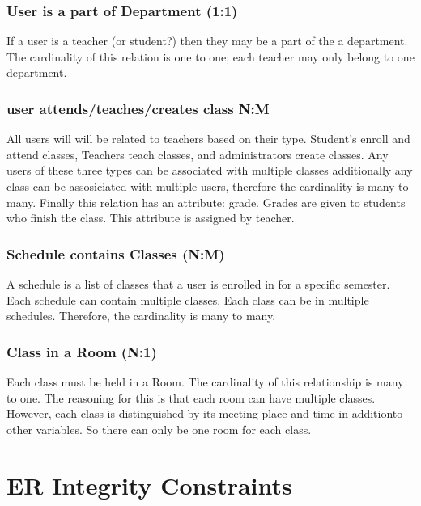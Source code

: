 \documentclass[11pt,oneside,a4paper]{article}
\begin{document}
\subsubsection{User is a part of Department (1:1)}
If a user is a teacher (or student?) then they may be a part of the a department.
 The cardinality of this relation is one to one; each teacher may only belong to 
one department.
\subsubsection{user attends/teaches/creates class N:M}
All users will will be related to teachers based on their type.  Student's enroll and 
attend classes, Teachers teach classes, and administrators create classes.  Any users 
of these three types can be associated with multiple classes additionally any class 
can be assosiciated with multiple users, therefore the cardinality is many to many. 
Finally this relation has an attribute: grade.  Grades are given to students who 
finish the class. This attribute is assigned by teacher.
\subsubsection{Schedule contains Classes (N:M)}

A schedule is a list of classes that a user is enrolled in for a specific semester.  Each schedule can contain multiple classes.  Each class can be in multiple schedules. Therefore, the cardinality is many to many. 
\subsubsection{Class in a Room (N:1)}
Each class must be held in a Room.  The cardinality of this relationship is many to one.  The reasoning for this is that each room can have multiple classes. However, each class is distinguished by its meeting place and time in additionto other variables.  So there can only be one room for each class. 
\section{ER Integrity Constraints}
\end{document}
